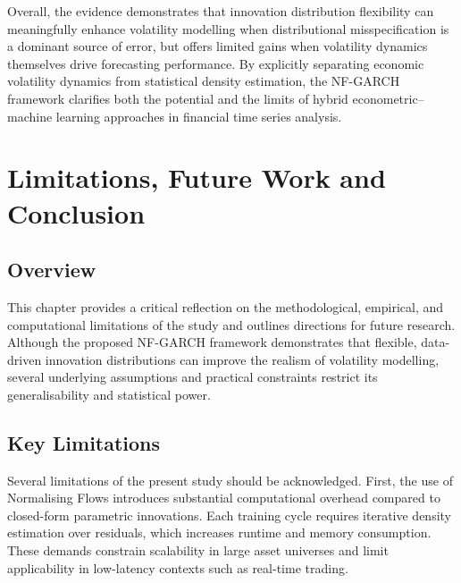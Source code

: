 \documentclass[oneside,12pt]{CUEDthesisPSnPDF}
\begin{document}
Overall, the evidence demonstrates that innovation distribution flexibility can meaningfully enhance volatility modelling when distributional misspecification is a dominant source of error, but offers limited gains when volatility dynamics themselves drive forecasting performance. By explicitly separating economic volatility dynamics from statistical density estimation, the NF-GARCH framework clarifies both the potential and the limits of hybrid econometric--machine learning approaches in financial time series analysis.\\


\chapter{Limitations, Future Work and Conclusion}

\section{Overview}
\noindent
This chapter provides a critical reflection on the methodological, empirical, and computational limitations of the study and outlines directions for future research. Although the proposed NF-GARCH framework demonstrates that flexible, data-driven innovation distributions can improve the realism of volatility modelling, several underlying assumptions and practical constraints restrict its generalisability and statistical power.\\


\section{Key Limitations}
\label{sec:limitations}
\noindent
Several limitations of the present study should be acknowledged.  
First, the use of Normalising Flows introduces substantial computational overhead compared to closed-form parametric innovations. Each training cycle requires iterative density estimation over residuals, which increases runtime and memory consumption. These demands constrain scalability in large asset universes and limit applicability in low-latency contexts such as real-time trading.\\
\end{document}

